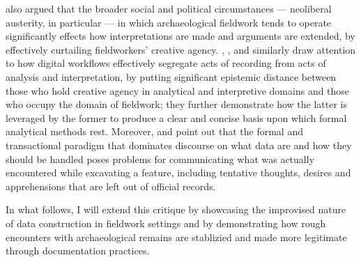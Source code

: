 \documentclass[
]{article}
\begin{document}
\textcite{thorpe2012} also argued that the broader social and political
circumstances --- neoliberal austerity, in particular --- in which
archaeological fieldwork tends to operate significantly effects how
interpretations are made and arguments are extended, by effectively
curtailing fieldworkers' creative agency. \textcite{huggett2022},
\textcite{caraher2019}, \textcite{batist2021} and
\textcite{batist-alienation} similarly draw attention to how digital
workflows effectively segregate acts of recording from acts of analysis
and interpretation, by putting significant epistemic distance between
those who hold creative agency in analytical and interpretive domains
and those who occupy the domain of fieldwork; they further demonstrate
how the latter is leveraged by the former to produce a clear and concise
basis upon which formal analytical methods rest. Moreover,
\textcite{batist2024a} and \textcite{haciguzeller2021} point out that
the formal and transactional paradigm that dominates discourse on what
data are and how they should be handled poses problems for communicating
what was actually encountered while excavating a feature, including
tentative thoughts, desires and apprehensions that are left out of
official records.

In what follows, I will extend this critique by showcasing the
improvised nature of data construction in fieldwork settings and by
demonstrating how rough encounters with archaeological remains are
stablizied and made more legitimate through documentation practices.

\printbibliography
\end{document}
